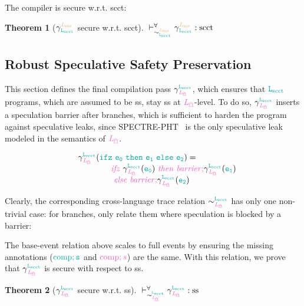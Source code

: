 \documentclass[acmsmall]{acmart}
\theoremstyle{definition}
\newtheorem{theorem}{Theorem}[section]
\begin{document}
\begin{center} 
\end{center}

The compiler is secure w.r.t. \gls*{scct}: %

\begin{theorem}[$\ccscct$ secure w.r.t. \gls*{scct}]\label{thm:ccscct:rtp:scct}
  \small
  $\rtpsim{\ccscct}{\scctsafe}{\sim^{\Lms}_{\Lscct}}$ %
\end{theorem}

\subsection{Robust Speculative Safety Preservation}\label{subsec:cs:ss}

This section defines the final compilation pass $\ccspec$, which ensures that $\Lscct$ programs, which are assumed to be \gls*{ss}, stay \gls*{ss} at $\Lspec$-level. 
To do so, $\ccspec$ inserts a speculation barrier after branches, which is sufficient to harden the program against speculative leaks, since SPECTRE-PHT~\cite{kocher2019spectre} is the only speculative leak modeled in the semantics of $\Lspec$.

\vspace{-1em}
\[
\begin{array}{cl}
  &\ccspec{(\obj{\lifz{\expr[_0]}{\expr[_1]}{\expr[_2]}})} = 
  \\
  &\qquad\qquad \lifz[\ird]{\ccspec{\left(\obj{\expr[_0]}\right)}}{\ird{\lbarrier;}\ccspec{\left(\obj{\expr[_1]}\right)} \\&\qquad\qquad}{ \ird{\lbarrier;}\ccspec{\left(\obj{\expr[_2]}\right)}} 
\end{array}
\]
%

Clearly, the corresponding cross-language trace relation $\sim^{\Lscct}_{\Lspec}$ has only one non-trivial case: for branches, only relate them where speculation is blocked by a barrier:

\begin{center}
\end{center}

The base-event relation above scales to full events by ensuring the missing annotations ($\obj{\comp;\securitytag{}}$ and $\ird{\comp;\securitytag{}}$) are the same.
% 
With this relation, we prove that $\ccspec$ is secure with respect to \gls*{ss}.
\begin{theorem}[$\ccspec$ secure w.r.t. \gls*{ss}]\label{thm:ccspec:rtp:spec}
  \small$\rtpsim{\ccspec}{\sssafe}{\sim^{\Lscct}_{\Lspec}}$ %
\end{theorem}
\end{document}

